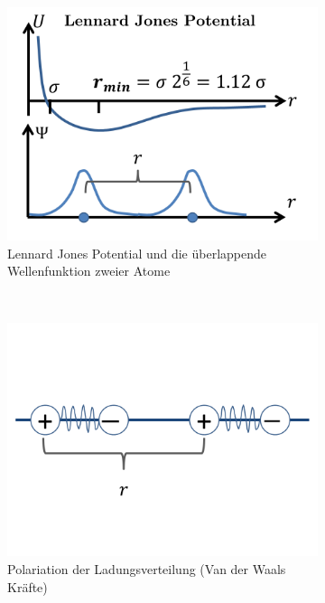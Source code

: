 \documentclass[12pt]{article}
\begin{document}
\begin{figure}[h] 
		\begin{subfigure}[h]{0.5 \textwidth}
		\centering
		\includegraphics[width=\textwidth]{Folie70.png}
		\caption{Lennard Jones Potential und die überlappende Wellenfunktion zweier Atome} 
		\label{fig:Lennard}
		\centering
	\end{subfigure}
	~
\begin{subfigure}[h]{0.5\textwidth}
		\centering
		\includegraphics[width=\textwidth]{Folie71.png}
		\caption{Polariation der Ladungsverteilung (Van der Waals Kräfte)}
		\label{fig:VdWaal}
		\centering
	\end{subfigure}
	\caption{} \label{Phasenraumtrajektorie}
\end{figure}	
\end{document}
